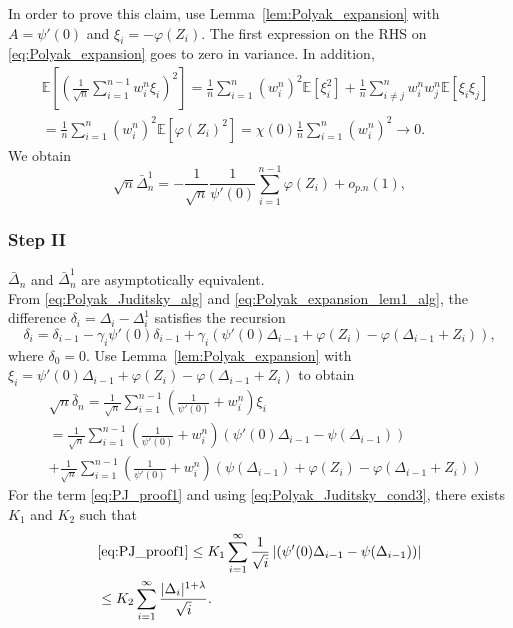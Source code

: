 \documentclass[letterpaper, 11pt]{IEEEtran}      %
\newcommand{\ex}[1]{\ensuremath{\mathbb{E}\left[ #1\right]}}
\begin{document}
{In order to prove this claim, use Lemma~\ref{lem:Polyak_expansion} with $A = \psi'(0)$ and $\xi_i = -\varphi(Z_i)$. The first expression on the RHS on \eqref{eq:Polyak_expansion} goes to zero in variance. In addition, 
\begin{align*}
& \ex{ \left( \frac{1}{\sqrt{n}} \sum_{i=1}^{n-1} w_i^n \xi_i \right)^2 }  = \frac{1}{n}  \sum_{i=1}^n (w_i^n)^2 \ex{ \xi_i^2} + \frac{1}{n}  \sum_{i\neq j}^n w_i^n w_j^n \ex{ \xi_i \xi_j} \\
& = \frac{1}{n}  \sum_{i=1}^n (w_i^n)^2 \ex{ \varphi(Z_i)^2} = \chi(0) \frac{1}{n}  \sum_{i=1}^n (w_i^n)^2 \to 0. 
\end{align*}
We obtain
\begin{equation}
\sqrt{n} \bar{\Delta}^1_n = -\frac{1}{\sqrt{n}} \frac{1}{\psi'(0)} \sum_{i=1}^{n-1} \varphi(Z_i)+ o_{p.n}(1), \label{eq:Polyak_expansion_aux_process}
\end{equation}

\subsubsection*{Step II} $\bar{\Delta}_n$ and $\bar{\Delta}^1_n$ are asymptotically equivalent. \\

From \eqref{eq:Polyak_Juditsky_alg} and \eqref{eq:Polyak_expansion_lem1_alg}, the difference $\delta_i = \Delta_i - \Delta_i^1$ satisfies the recursion
\[
\delta_i = \delta_{i-1} - \gamma_i \psi'(0) \delta_{i-1} + \gamma_i \left( \psi'(0) \Delta_{i-1}  + \varphi(Z_i) - \varphi(\Delta_{i-1} + Z_i) \right),
\]
where $\delta_0 = 0$. Use Lemma~\ref{lem:Polyak_expansion} with $\xi_i =  \psi'(0) \Delta_{i-1}  + \varphi(Z_i) - \varphi(\Delta_{i-1} + Z_i)$ to obtain
\begin{align}
& \sqrt{n}\bar{\delta}_n = \frac{1}{\sqrt{n}} \sum_{i=1}^{n-1} \left( \frac{1}{\psi'(0)}  + w_i^n \right)  \xi_i  \\
& = \frac{1}{\sqrt{n}} \sum_{i=1}^{n-1} \left( \frac{1}{\psi'(0)}  + w_i^n \right)  \left( \psi'(0) \Delta_{i-1}  - \psi(\Delta_{i-1}) \right) \label{eq:PJ_proof1} \\
& + 
\frac{1}{\sqrt{n}} \sum_{i=1}^{n-1} \left( \frac{1}{\psi'(0)}  + w_i^n \right)  \left( \psi(\Delta_{i-1})  + \varphi(Z_i) - \varphi(\Delta_{i-1}+Z_i)
\right) \label{eq:PJ_proof2}
\end{align}
For the term \eqref{eq:PJ_proof1} and using \eqref{eq:Polyak_Juditsky_cond3}, there exists $K_1$ and $K_2$ such that 
\begin{align*}
& \eqref{eq:PJ_proof1}
\leq K_1 \sum_{i=1}^\infty \frac{1}{\sqrt{i}} \left| \left( \psi'(0) \Delta_{i-1}  - \psi(\Delta_{i-1}) \right) \right| \\
& \leq K_2 \sum_{i=1}^\infty \frac{ |\Delta_i|^{1+\lambda}}{\sqrt{i}}. 
\end{align*}

}
\end{document}
